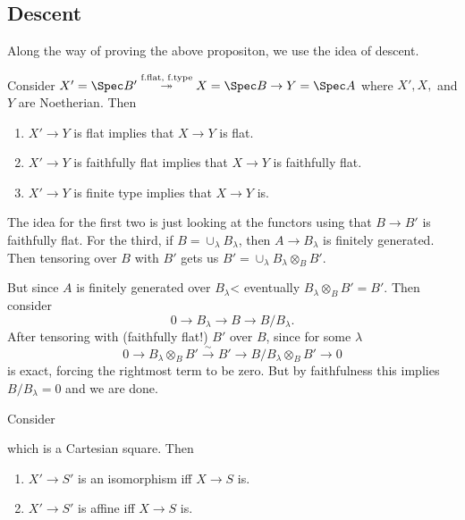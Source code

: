 \documentclass[12pt]{article}
\begin{document}
\subsection{Descent}
Along the way of proving the above propositon, we use the idea of descent.
\begin{lem}
	Consider $X'=\Spec B'\stackrel{\text{f.flat, f.type}}{\twoheadrightarrow}X=\Spec B\to Y=\Spec A$
	where $X',X,$ and $Y$ are Noetherian. Then 
	\begin{enumerate}
		\item $X'\to Y$ is flat implies that $X\to Y$ is flat.
		\item $X'\to Y$ is faithfully flat implies that $X\to Y$ is faithfully flat.
		\item $X'\to Y$ is finite type implies that $X\to Y$ is.
	\end{enumerate}
\end{lem}
\begin{rmk}
	The idea for the first two is just looking at the functors using that $B\to B'$ is faithfully flat. For the third, if $B=\cup_\lambda B_\lambda$,
	then $A\to B_\lambda$ is finitely generated. Then tensoring over $B$ with $B'$ gets us $B'=\cup_\lambda B_\lambda\otimes_B B'$.

	But since $A$ is finitely generated over $B_\lambda$< eventually $B_\lambda\otimes_BB'=B'$. Then 
	consider
	\[0\to B_\lambda\to B\to B/B_\lambda.\]
	After tensoring with (faithfully flat!) $B'$ over $B$, since for some $\lambda$
	\[0\to B_\lambda\otimes_B B'\xrightarrow{\sim}B'\to B/B_\lambda\otimes_BB'\to 0\]
	is exact, forcing the rightmost term to be zero. But by faithfulness this implies $B/B_\lambda=0$ and we are done.
\end{rmk}
\begin{prop}
	Consider
	\begin{center}
	\end{center}
	which is a Cartesian square. Then 
	\begin{enumerate}
		\item $X'\to S'$ is an isomorphism iff $X\to S$ is.
		\item $X'\to S'$ is affine iff $X\to S$ is.
	\end{enumerate}
\end{prop}
\end{document}
